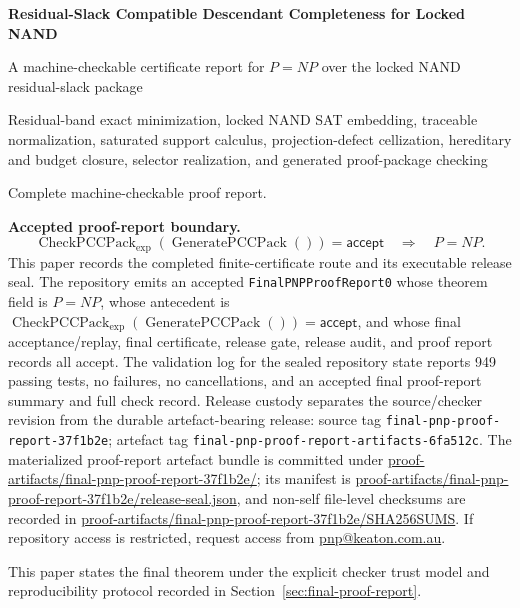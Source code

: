 \documentclass[10.5pt,a4paper]{article}
\newcommand{\CheckPack}{\operatorname{CheckPCCPack}_{\exp}}
\newcommand{\GenPack}{\operatorname{GeneratePCCPack}}
\begin{document}
\begin{titlepage}
\centering
\vspace*{1.0cm}
{\Huge\bfseries Residual-Slack Compatible Descendant Completeness for Locked NAND\par}
\vspace{0.45cm}
{\Large A machine-checkable certificate report for \(P=NP\) over the locked NAND residual-slack package\par}
\vspace{0.75cm}
{\large Residual-band exact minimization, locked NAND SAT embedding, traceable normalization, saturated support calculus, projection-defect cellization, hereditary and budget closure, selector realization, and generated proof-package checking\par}
\vspace{0.85cm}
{\large Complete machine-checkable proof report.\par}
\vfill
\begin{minipage}{0.88\textwidth}
\textbf{Accepted proof-report boundary.}
\[
\CheckPack(\GenPack())=\mathsf{accept}\quad\Longrightarrow\quad P=NP.
\]
This paper records the completed finite-certificate route and its executable release seal.  The repository emits an accepted \texttt{FinalPNPProofReport0} whose theorem field is \(P=NP\), whose antecedent is \(\CheckPack(\GenPack())=\mathsf{accept}\), and whose final acceptance/replay, final certificate, release gate, release audit, and proof report records all accept.  The validation log for the sealed repository state reports 949 passing tests, no failures, no cancellations, and an accepted final proof-report summary and full check record.  Release custody separates the source/checker revision from the durable artefact-bearing release: source tag \texttt{final-pnp-proof-report-37f1b2e}; artefact tag \texttt{final-pnp-proof-report-artifacts-6fa512c}.  The materialized proof-report artefact bundle is committed under \url{proof-artifacts/final-pnp-proof-report-37f1b2e/}; its manifest is \url{proof-artifacts/final-pnp-proof-report-37f1b2e/release-seal.json}, and non-self file-level checksums are recorded in \url{proof-artifacts/final-pnp-proof-report-37f1b2e/SHA256SUMS}. If repository access is restricted, request access from \href{mailto:pnp@keaton.com.au}{pnp@keaton.com.au}.
\end{minipage}
\vfill
{\small This paper states the final theorem under the explicit checker trust model and reproducibility protocol recorded in Section~\ref{sec:final-proof-report}.}\par
\end{titlepage}
\end{document}
